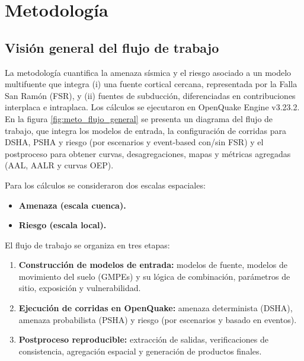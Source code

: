 \chapter{Metodología}
\label{ch:metodologia}

\section{Visión general del flujo de trabajo}
\label{sec:meto_vision_general}

La metodología cuantifica la amenaza sísmica y el riesgo asociado a un modelo multifuente que integra (i) una fuente cortical cercana, representada por la Falla San Ramón (FSR), y (ii) fuentes de subducción, diferenciadas en contribuciones interplaca e intraplaca. Los cálculos se ejecutaron en OpenQuake Engine v3.23.2. En la figura \ref{fig:meto_flujo_general} se presenta un diagrama del flujo de trabajo, que integra los modelos de entrada, la configuración de corridas para DSHA, PSHA y riesgo (por escenarios y event-based con/sin FSR) y el postproceso para obtener curvas, desagregaciones, mapas y métricas agregadas (AAL, AALR y curvas OEP).

Para los cálculos se consideraron dos escalas espaciales:
\begin{itemize}
    \item \textbf{Amenaza (escala cuenca).}
    \item \textbf{Riesgo (escala local).}
\end{itemize}

El flujo de trabajo se organiza en tres etapas:
\begin{enumerate}
    \item \textbf{Construcción de modelos de entrada:} modelos de fuente, modelos de movimiento del suelo (GMPEs) y su lógica de combinación, parámetros de sitio, exposición y vulnerabilidad.
    \item \textbf{Ejecución de corridas en OpenQuake:} amenaza determinista (DSHA), amenaza probabilista (PSHA) y riesgo (por escenarios y basado en eventos).
    \item \textbf{Postproceso reproducible:} extracción de salidas, verificaciones de consistencia, agregación espacial y generación de productos finales.
\end{enumerate}

